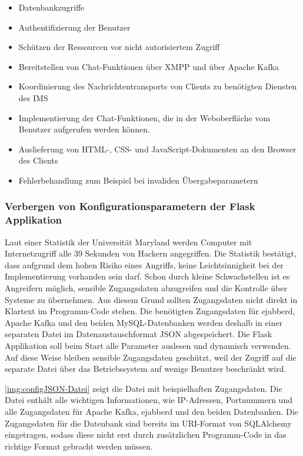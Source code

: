 \documentclass[a4paper,titlepage,halfparskip,12pt]{scrreprt}
\begin{document}
\begin{onehalfspacing}
\begin{itemize}
\item Datenbankzugriffe
\item Authentifizierung der Benutzer
\item Schützen der Ressourcen vor nicht autorisiertem Zugriff
\item Bereitstellen von Chat-Funktionen über \ac{XMPP} und über Apache Kafka
\item Koordinierung des Nachrichtentransports von Clients zu benötigten Diensten des \ac{IMS}
\item Implementierung der Chat-Funktionen, die in der Weboberfläche vom Benutzer aufgerufen werden können.
\item Auslieferung von \ac{HTML}-, \ac{CSS}- und JavaScript-Dokumenten an den Browser des Clients
\item Fehlerbehandlung zum Beispiel bei invaliden Übergabeparametern
\end{itemize}


\subsubsection*{Verbergen von Konfigurationsparametern der Flask Applikation}

Laut einer Statistik der Universität Maryland \cite{securityStatisticWebSites} werden Computer mit Internetzugriff alle 39 Sekunden von Hackern angegriffen. Die Statistik bestätigt, dass aufgrund dem hohen Risiko eines Angriffs, keine Leichtsinnigkeit bei der Implementierung vorhanden sein darf. Schon durch kleine Schwachstellen ist es Angreifern möglich, sensible Zugangsdaten abzugreifen und die Kontrolle über Systeme zu übernehmen. Aus diesem Grund sollten Zugangsdaten nicht direkt in Klartext im Programm-Code stehen. Die benötigten Zugangsdaten für ejabberd, Apache Kafka und den beiden MySQL-Datenbanken werden deshalb in einer separaten Datei im Datenaustauschformat \acs{JSON} abgespeichert. Die Flask Applikation soll beim Start alle Parameter auslesen und dynamisch verwenden. Auf diese Weise bleiben sensible Zugangsdaten geschützt, weil der Zugriff auf die separate Datei über das Betriebssystem auf wenige Benutzer beschränkt wird.

\pagebreak

\autoref{img:configJSON-Datei} zeigt die Datei mit beispielhaften Zugangsdaten. Die Datei enthält alle wichtigen Informationen, wie IP-Adressen, Portnummern und alle Zugangsdaten für Apache Kafka, ejabberd und den beiden Datenbanken. Die Zugangsdaten für die Datenbank sind bereits im \acs{URI}-Format von SQLAlchemy eingetragen, sodass diese nicht erst durch zusätzlichen Programm-Code in das richtige Format gebracht werden müssen.


\end{onehalfspacing}
\end{document}
